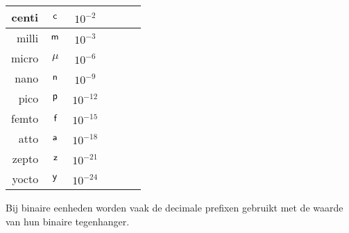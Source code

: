\begin{center}
\begin{tabular}{|r|c|c||r|c|c|}
\hline
     centi & $\,\textsf{c}\,$ & $10^{-2^{\phantom n}}$ &            &            &            \\
\hline
     milli & $\,\textsf{m}\,$ & $10^{-3^{\phantom n}}$ &            &            &            \\
\hline
     micro & $\mu$ & $10^{-6^{\phantom n}}$ &                 &            &            \\
\hline
      nano & $\,\textsf{n}\,$ & $10^{-9^{\phantom n}}$ &            &            &            \\
\hline
      pico & $\,\textsf{p}\,$ & $10^{-12^{\phantom n}}$ &            &            &            \\
\hline
     femto & $\,\textsf{f}\,$ & $10^{-15^{\phantom n}}$ &            &            &            \\
\hline
      atto & $\,\textsf{a}\,$ & $10^{-18^{\phantom n}}$ &            &            &            \\
\hline
     zepto & $\,\textsf{z}\,$ & $10^{-21^{\phantom n}}$ &            &            &            \\
\hline
     yocto & $\,\textsf{y}\,$ & $10^{-24^{\phantom n}}$ &            &            &            \\
\hline
\end{tabular}  
\end{center}

\begin{opmerking}
 Bij binaire eenheden worden vaak de decimale prefixen gebruikt met de waarde van hun binaire tegenhanger.
\end{opmerking}
